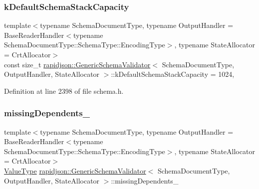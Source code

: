 \subsubsection{\texorpdfstring{kDefaultSchemaStackCapacity}{kDefaultSchemaStackCapacity}}
{\footnotesize\ttfamily template$<$typename Schema\+Document\+Type, typename Output\+Handler = Base\+Reader\+Handler$<$typename Schema\+Document\+Type\+::\+Schema\+Type\+::\+Encoding\+Type$>$, typename State\+Allocator = Crt\+Allocator$>$ \\
const size\+\_\+t \mbox{\hyperlink{classrapidjson_1_1_generic_schema_validator}{rapidjson\+::\+Generic\+Schema\+Validator}}$<$ Schema\+Document\+Type, Output\+Handler, State\+Allocator $>$\+::k\+Default\+Schema\+Stack\+Capacity = 1024\hspace{0.3cm}{\ttfamily [static]}, {\ttfamily [private]}}



Definition at line 2398 of file schema.\+h.

\mbox{\label{classrapidjson_1_1_generic_schema_validator_a733bfc17572fc619e3b0d43d08ec94fd}} 
\subsubsection{\texorpdfstring{missingDependents\_}{missingDependents\_}}
{\footnotesize\ttfamily template$<$typename Schema\+Document\+Type, typename Output\+Handler = Base\+Reader\+Handler$<$typename Schema\+Document\+Type\+::\+Schema\+Type\+::\+Encoding\+Type$>$, typename State\+Allocator = Crt\+Allocator$>$ \\
\mbox{\hyperlink{classrapidjson_1_1_generic_schema_validator_a14216aea798d69f102987c1aae36e897}{Value\+Type}} \mbox{\hyperlink{classrapidjson_1_1_generic_schema_validator}{rapidjson\+::\+Generic\+Schema\+Validator}}$<$ Schema\+Document\+Type, Output\+Handler, State\+Allocator $>$\+::missing\+Dependents\+\_\+\hspace{0.3cm}{\ttfamily [private]}}



